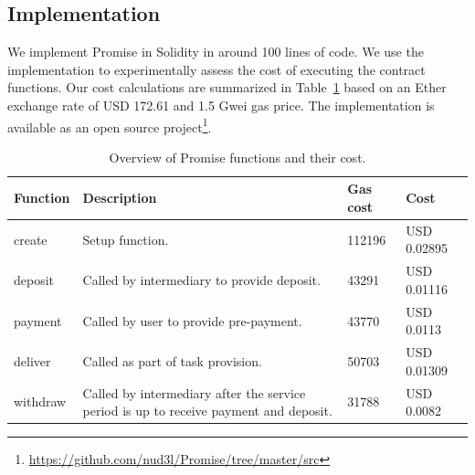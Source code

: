 \documentclass[runningheads]{llncs}
\newcommand{\sys}{Promise\xspace}
\begin{document}




\subsection{Implementation}

We implement \sys in Solidity in around 100 lines of code.
We use the implementation to experimentally assess the cost of executing the contract functions.
Our cost calculations are summarized in Table~\ref{tab:implementation} based on an Ether exchange rate of USD 172.61 and 1.5 Gwei gas price.
The implementation is available as an open source project\footnote{\url{https://github.com/nud3l/Promise/tree/master/src}}.

\begin{table}[h]
\centering
\caption{Overview of \sys functions and their cost.}
\label{tab:implementation}
\begin{tabularx}{\textwidth}{lXll}
\toprule 
\textbf{Function} & \textbf{Description} & \textbf{Gas cost} & \textbf{Cost} \\ \toprule
create & Setup function. & 112196 & USD 0.02895 \\ 
deposit & Called by intermediary to provide deposit. & 43291 & USD 0.01116 \\
payment & Called by user to provide pre-payment. & 43770 & USD 0.0113 \\ \midrule
deliver & Called as part of task provision. & 50703 & USD 0.01309 \\ \midrule
withdraw & Called by intermediary after the service period is up to receive payment and deposit. & 31788 & USD 0.0082 \\
\bottomrule
\end{tabularx}
\end{table}
\end{document}
